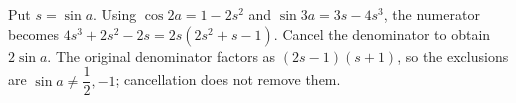 Put $s=\sin a$. Using $\cos2a=1-2s^2$ and $\sin3a=3s-4s^3$, the numerator becomes $4s^3+2s^2-2s=2s(2s^2+s-1)$. Cancel the denominator to obtain $\boxed{2\sin a}$. The original denominator factors as $(2s-1)(s+1)$, so the exclusions are $\sin a \ne \dfrac{1}{2} , - 1$; cancellation does not remove them.
